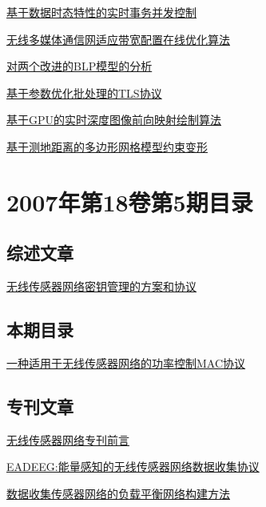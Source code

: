 \documentclass[a4paper]{article}
\begin{document}
\href{http://www.jos.org.cn/ch/reader/download_pdf.aspx?file_no=20070618&year_id=2007&quarter_id=6&falg=1}{基于数据时态特性的实时事务并发控制}

\href{http://www.jos.org.cn/ch/reader/download_pdf.aspx?file_no=20070620&year_id=2007&quarter_id=6&falg=1}{无线多媒体通信网适应带宽配置在线优化算法}

\href{http://www.jos.org.cn/ch/reader/download_pdf.aspx?file_no=20070621&year_id=2007&quarter_id=6&falg=1}{对两个改进的BLP模型的分析}

\href{http://www.jos.org.cn/ch/reader/download_pdf.aspx?file_no=20070623&year_id=2007&quarter_id=6&falg=1}{基于参数优化批处理的TLS协议}

\href{http://www.jos.org.cn/ch/reader/download_pdf.aspx?file_no=20070624&year_id=2007&quarter_id=6&falg=1}{基于GPU的实时深度图像前向映射绘制算法}

\href{http://www.jos.org.cn/ch/reader/download_pdf.aspx?file_no=20070625&year_id=2007&quarter_id=6&falg=1}{基于测地距离的多边形网格模型约束变形}


\section{\textbf{2007年第18卷第5期目录}}
\subsection{综述文章}
\href{http://www.jos.org.cn/ch/reader/download_pdf.aspx?file_no=20070514&year_id=2007&quarter_id=5&falg=1}{无线传感器网络密钥管理的方案和协议}

\subsection{本期目录}
\href{http://www.jos.org.cn/ch/reader/download_pdf.aspx?file_no=20070502&year_id=2007&quarter_id=5&falg=1}{一种适用于无线传感器网络的功率控制MAC协议}

\subsection{专刊文章}
\href{http://www.jos.org.cn/ch/reader/download_pdf.aspx?file_no=20070501&year_id=2007&quarter_id=5&falg=1}{无线传感器网络专刊前言}

\href{http://www.jos.org.cn/ch/reader/download_pdf.aspx?file_no=20070503&year_id=2007&quarter_id=5&falg=1}{EADEEG:能量感知的无线传感器网络数据收集协议}

\href{http://www.jos.org.cn/ch/reader/download_pdf.aspx?file_no=20070504&year_id=2007&quarter_id=5&falg=1}{数据收集传感器网络的负载平衡网络构建方法}
\end{document}
